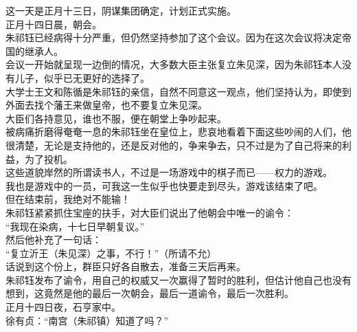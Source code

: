 \begin{multicols}{\theparacolNo}
这一天是正月十三日，阴谋集团确定，计划正式实施。\\

正月十四日晨，朝会。\\

朱祁钰已经病得十分严重，但仍然坚持参加了这个会议。因为在这次会议将决定帝国的继承人。\\

会议一开始就呈现一边倒的情况，大多数大臣主张复立朱见深，因为朱祁钰本人没有儿子，似乎已无更好的选择了。\\

大学士王文和陈循是朱祁钰的亲信，自然不同意这一观点，他们坚持认为，即使到外面去找个藩王来做皇帝，也不要复立朱见深。\\

大臣们各持意见，谁也不服，便在朝堂上争吵起来。\\

被病痛折磨得奄奄一息的朱祁钰坐在皇位上，悲哀地看着下面这些吵闹的人们，他很清楚，无论是支持他的，还是反对他的，争来争去，只不过是为了自己将来的利益，为了投机。\\

这些道貌岸然的所谓读书人，不过是一场游戏中的棋子而已——权力的游戏。\\

我也是游戏中的一员，可我这一生似乎也快要走到尽头，游戏该结束了吧。\\

但在结束前，我绝对不能输！\\

朱祁钰紧紧抓住宝座的扶手，对大臣们说出了他朝会中唯一的谕令：\\

“我现在染病，十七日早朝复议。”\\

然后他补充了一句话：\\

“复立沂王（朱见深）之事，不行！”（所请不允）\\

话说到这个份上，群臣只好各自散去，准备三天后再来。\\

朱祁钰发布了谕令，用自己的权威又一次赢得了暂时的胜利，但估计他自己也没有想到，这竟然是他的最后一次朝会，最后一道谕令，最后一次胜利。\\

正月十四日夜，石亨家中。\\

徐有贞：“南宫（朱祁镇）知道了吗？”\\


\end{multicols}
